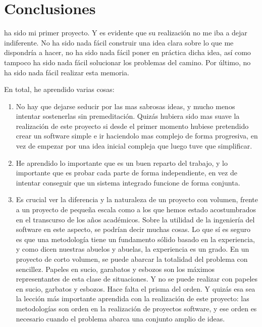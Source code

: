 %


\chapter{Conclusiones}
\label{chap:conclusiones}

\gom ha sido mi primer proyecto. Y es evidente que su realización no
me iba a dejar indiferente. No ha sido nada fácil construir una idea
clara sobre lo que me dispondría a hacer, no ha sido nada fácil
poner en práctica dicha idea, así como tampoco ha sido nada fácil
solucionar los problemas del camino. Por último, no ha sido nada fácil
realizar esta memoria.

En total, he aprendido varias cosas:
\begin{enumerate}
\item No hay que dejarse seducir por las mas sabrosas ideas, y mucho
  menos intentar sostenerlas sin premeditación. Quizás hubiera sido
  mas suave la realización de este proyecto si desde el primer momento
  hubiese pretendido crear un software simple e ir haciendolo mas
  complejo de forma progresiva, en vez de empezar por una idea inicial
  compleja que luego tuve que simplificar.

\item He aprendido lo importante que es un buen reparto del trabajo, y
  lo importante que es probar cada parte de forma independiente, en
  vez de intentar conseguir que un sistema integrado funcione de forma
  conjunta.

\item Es crucial ver la diferencia y la naturaleza de un proyecto con
  volumen, frente a un proyecto de pequeña escala como a los que
  hemos estado acostumbrados en el transcurso de los años
  académicos. Sobre la utilidad de la ingeniería del software en este
  aspecto, se podrían decir muchas cosas. Lo que sí es seguro es que
  una metodología tiene un fundamento sólido basado en la experiencia,
  y como dicen nuestras abuelos y abuelas, la experiencia es un
  grado. En un proyecto de corto volumen, se puede abarcar la
  totalidad del problema con sencillez. Papeles en sucio, garabatos y
  esbozos son los máximos representantes de esta clase de
  situaciones. Y \gom no se puede realizar con papeles en sucio,
  garbatos y esbozos. Hace falta el prisma del orden. Y quizás esa sea
  la lección más importante aprendida con la realización de este
  proyecto: las metodologías son orden en la realización de
  proyectos software, y ese orden es necesario cuando el problema
  abarca una conjunto amplio de ideas.
\end{enumerate}

